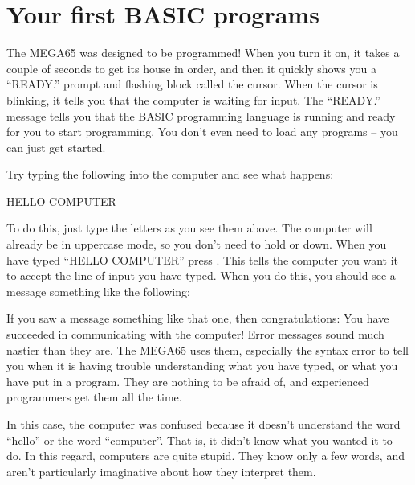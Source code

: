 \section{Your first BASIC programs}

The MEGA65 was designed to be programmed! When you turn it on,
it takes a couple of seconds to get its house in order, and then
it quickly shows you a ``READY.'' prompt and flashing block called
the cursor.  When the cursor is blinking, it tells you that the
computer is waiting for input.  The ``READY.'' message tells you
that the BASIC programming language is running and ready for you to
start programming.  You don't even need to load any programs --
you can just get started.

\needspace{4cm} %
Try typing the following into the computer and see what happens:

\begin{screenoutput}
HELLO COMPUTER
\end{screenoutput}

\needspace{4cm} %

To do this, just type the letters as you see them above.  The computer
will already be in uppercase mode, so you don't need to hold 
or  down.  When you have typed ``HELLO COMPUTER'' press
  .  This tells the computer you want it to accept the
  line of input you have typed.  When you do this, you should see a message something
  like the following:


  If you saw a  message something like that one, then congratulations:
  You have succeeded in communicating with the computer!
  Error messages sound much nastier than they are.  The MEGA65 uses them, especially
  the syntax error to tell you when it is having trouble understanding what you have
  typed, or what you have put in a program.  They are nothing to be afraid of, and
  experienced programmers get them all the time.

  In this case, the computer was confused because it doesn't understand the word
  ``hello'' or the word ``computer''.  That is, it didn't know what you wanted it to
  do.  In this regard, computers are quite stupid. They know only a few words, and
  aren't particularly imaginative about how they interpret them.

